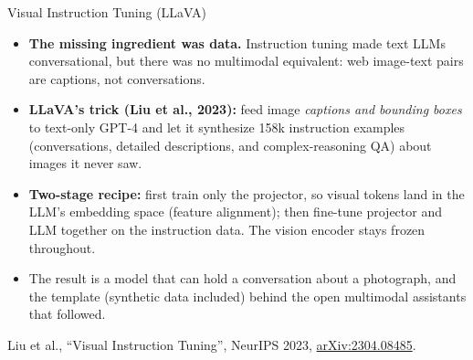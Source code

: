 \begin{frame}{Visual Instruction Tuning (LLaVA)}
  \begin{itemize}
    \item[{\color{red}\textbullet}] \textbf{The missing ingredient was data.} Instruction tuning made text
      LLMs conversational, but there was no multimodal equivalent: web image-text pairs are captions, not
      conversations.
    \item[{\color{red}\textbullet}] \textbf{LLaVA's trick (Liu et al., 2023):} feed image \emph{captions and
      bounding boxes} to text-only GPT-4 and let it synthesize 158k instruction examples (conversations,
      detailed descriptions, and complex-reasoning QA) about images it never saw.
    \item[{\color{red}\textbullet}] \textbf{Two-stage recipe:} first train only the projector, so visual
      tokens land in the LLM's embedding space (feature alignment); then fine-tune projector and LLM
      together on the instruction data. The vision encoder stays frozen throughout.
    \item[{\color{red}\textbullet}] The result is a model that can hold a conversation about a photograph,
      and the template (synthetic data included) behind the open multimodal assistants that followed.
  \end{itemize}
  \vspace{0.3em}
  {\scriptsize Liu et al., ``Visual Instruction Tuning'', NeurIPS 2023, \href{https://arxiv.org/abs/2304.08485}{arXiv:2304.08485}.}
\end{frame}

